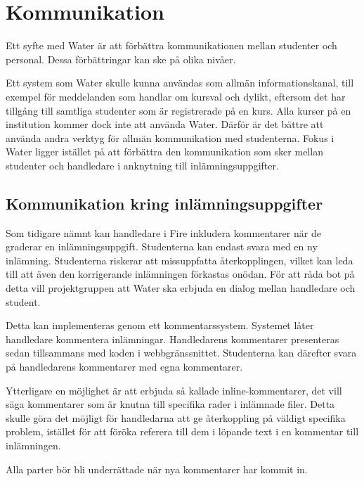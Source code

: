 \section{Kommunikation}

Ett syfte med Water är att förbättra kommunikationen mellan studenter och personal. Dessa förbättringar kan ske på olika nivåer.

Ett system som Water skulle kunna användas som allmän informationskanal, till exempel för meddelanden som handlar om kursval och dylikt,  eftersom det har tillgång till samtliga studenter som är registrerade på en kurs. Alla kurser på en institution kommer dock inte att använda Water. Därför är det bättre att använda andra verktyg för allmän kommunikation med studenterna. Fokus i Water ligger istället på att förbättra den kommunikation som sker mellan studenter och handledare i anknytning till inlämningsuppgifter.

\subsection{Kommunikation kring inlämningsuppgifter}
Som tidigare nämnt kan handledare i Fire inkludera kommentarer när de graderar en inlämningsuppgift. Studenterna kan endast svara med en ny inlämning. Studenterna riskerar att missuppfatta återkopplingen, vilket kan leda till att även den korrigerande inlämningen förkastas onödan. För att råda bot på detta vill projektgruppen att Water  ska erbjuda en dialog mellan handledare och student.

Detta kan implementeras genom ett kommentarssystem. Systemet låter handledare kommentera inlämningar. Handledarens kommentarer presenteras sedan tillsammans med koden i webbgränssnittet. Studenterna kan därefter svara på handledarens kommentarer med egna kommentarer.

Ytterligare en möjlighet är att erbjuda så kallade inline-kommentarer, det vill säga kommentarer som är knutna till specifika rader i inlämnade filer. Detta skulle göra det möjligt för handledarna att ge återkoppling på väldigt specifika problem, istället för att föröka referera till dem i löpande text i en kommentar till inlämningen.

Alla parter bör bli underrättade när nya kommentarer har kommit in.
